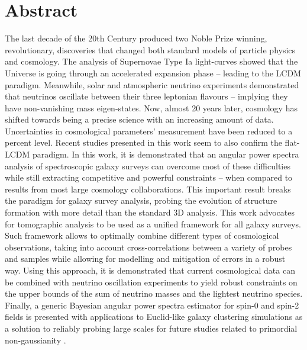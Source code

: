 %
\chapter*{Abstract}
\label{sec:abstract}
\vspace*{-10mm}

The last decade of the 20th Century produced two Noble Prize winning, revolutionary, discoveries that changed both standard models of particle physics and cosmology. The analysis of Supernovae Type Ia light-curves showed that the Universe is going through an accelerated expansion phase -- leading to the LCDM paradigm. Meanwhile, solar and atmospheric neutrino experiments demonstrated that neutrinos oscillate between their three leptonian flavours -- implying they have non-vanishing mass eigen-states. Now, almost 20 years later, cosmology has shifted towards being a precise science with an increasing amount of data. Uncertainties in cosmological parameters' measurement have been reduced to a percent level. Recent studies presented in this work seem to also confirm the flat-LCDM paradigm. In this work, it is demonstrated that an angular power spectra analysis of spectroscopic galaxy surveys can overcome most of these difficulties while still extracting competitive and powerful constraints -- when compared to results from most large cosmology collaborations. This important result breaks the paradigm for galaxy survey analysis, probing the evolution of structure formation with more detail than the standard 3D analysis. This work advocates for tomographic analysis to be used as a unified framework for all galaxy surveys. Such framework allows to optimally combine different types of cosmological observations, taking into account cross-correlations between a variety of probes and samples while allowing for modelling and mitigation of errors in a robust way. Using this approach, it is demonstrated that current cosmological data can be combined with neutrino oscillation experiments to yield robust constraints on the upper bounds of the sum of neutrino masses and the lightest neutrino species. Finally, a generic Bayesian angular power spectra estimator for spin-0 and spin-2 fields is presented with applications to Euclid-like galaxy clustering simulations as a solution to reliably probing large scales for future studies related to primordial non-gaussianity .